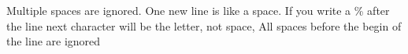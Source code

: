 \documentclass{article}
\begin{document}
\vspace*{\fill} \vspace*{-5ex}

Multiple spaces      are ignored.
 One new line is like a space.
If you write a \% after the line%
    next character will be the letter, not space, 
    All spaces before the begin of the line are ignored

\vspace*{\fill}
\end{document}
